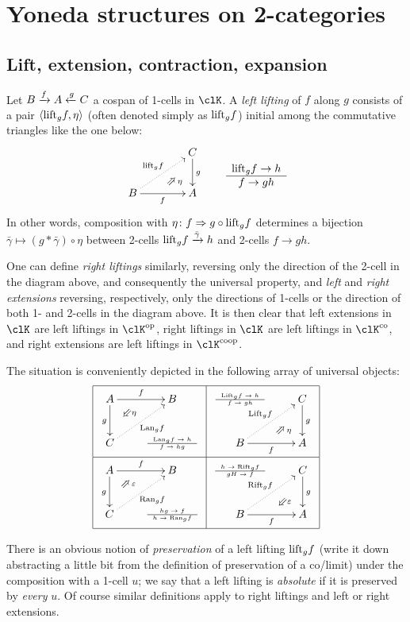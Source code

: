 \section{Yoneda structures on 2-categories}
\subsection{Lift, extension, contraction, expansion}
\begin{definition}
  Let $B \xrightarrow{f} A \xleftarrow{g}C$ a cospan of 1-cells in $\clK$. A \emph{left
lifting} of $f$ along $g$ consists of a pair $\langle\text{lift}_gf,\eta\rangle$
(often denoted simply as $\text{lift}_gf$) initial among the commutative triangles
like the one below:
\[ \vcenter{\xymatrix@C=1.4cm{& C\ar[d]^g \\ B\ar[r]_f \ar@{.>}[ur]^{\leeft_gf}
& \ar@{}[ul]|(.3){\Nearrow\eta} A}} \qquad \deduction{\leeft_gf}{h}{f}{gh}
\] In other words, composition with $\eta \colon f \Rightarrow g \circ \text{lift}_gf$
determines a bijection $\bar\gamma \mapsto (g * \bar\gamma)\circ \eta$ between
2-cells $\text{lift}_gf \xrightarrow{\bar\gamma} h$ and 2-cells $f \to gh$.
\end{definition}
\begin{remark}
One can define \emph{right liftings} similarly, reversing only
the direction of the 2-cell in the diagram above, and consequently the universal
property, and \emph{left} and \emph{right extensions} reversing, respectively,
only the directions of 1-cells or the direction of both 1- and 2-cells in the
diagram above. It is then clear that left extensions in $\clK$ are left liftings
in $\clK^\opp$, right liftings in $\clK$ are left liftings in $\clK^\co$, and
right extensions are left liftings in $\clK^\coop$.

The situation is conveniently depicted in the following array of universal
objects:
\[
\begin{array}{|c|c|}\hline \xymatrix{A \ar@{}[dr]|(.3){\Swarrow\eta}\ar[d]_g
\ar[r]^f& B \\ C \ar@{.>}[ur]_{\Lan_gf} & {\tiny \deduction{\Lan_gf}{h}{f}{hg}}}
& \xymatrix{{\tiny \deduction{\Lift_gf}{h}{f}{gh}} & C\ar[d]^g \\ B\ar[r]_f
\ar@{.>}[ur]^{\Lift_gf} & \ar@{}[ul]|(.3){\Nearrow\eta} A} \\ \hline
\xymatrix{A \ar@{}[dr]|(.3){\Nearrow\varepsilon}\ar[d]_g \ar[r]^f& B \\ C
\ar@{.>}[ur]_{\Ran_gf} & {\tiny \deduction{hg}{f}{h}{\Ran_gf}}} &
\xymatrix{{\tiny \deduction{h}{\Rift_gf}{gH}{f}} & C\ar[d]^g \\ B\ar[r]_f
\ar@{.>}[ur]^{\Rift_gf} & \ar@{}[ul]|(.3){\Swarrow\varepsilon} A} \\ \hline
\end{array}
\]
\end{remark}
\begin{definition}
There is an obvious notion of \emph{preservation} of a left lifting $\text{lift}_gf$
(write it down abstracting a little bit from the definition of preservation of a
co/limit) under the composition with a 1-cell $u$; we say that a left lifting is
\emph{absolute} if it is preserved by \emph{every} $u$. Of course similar
definitions apply to right liftings and left or right extensions.
\end{definition}
